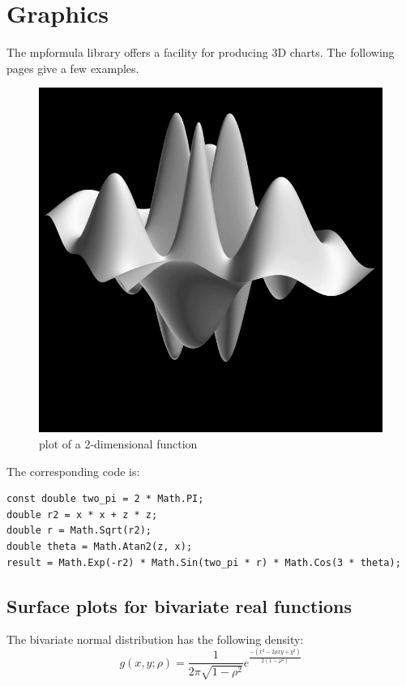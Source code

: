 \newpage
\section{Graphics}
\label{Tutorial: Graphics}
The mpformula library offers a facility for producing 3D charts. The following pages give a few examples.

\begin{figure}[ht]
	\centering
	\includegraphics[scale=3.0]{Charts/jpg/SurfaceBlackAndWhite.jpg}
	\caption{plot of a 2-dimensional function}
	\label{Fig plot of a 2-dimensional function}
\end{figure}


The corresponding code is:
\begin{lstlisting}
const double two_pi = 2 * Math.PI;
double r2 = x * x + z * z;
double r = Math.Sqrt(r2);
double theta = Math.Atan2(z, x);
result = Math.Exp(-r2) * Math.Sin(two_pi * r) * Math.Cos(3 * theta);
\end{lstlisting}


\newpage
\subsection{Surface plots for bivariate real functions}

The bivariate normal distribution has the following density:
\begin{equation}
	g(x,y;\rho) = \frac{1}{2 \pi \sqrt{1-\rho^2}} e^{\frac{-(x^2 -2\rho x y + y^2)}{2(1-\rho^2)}}
\end{equation}


